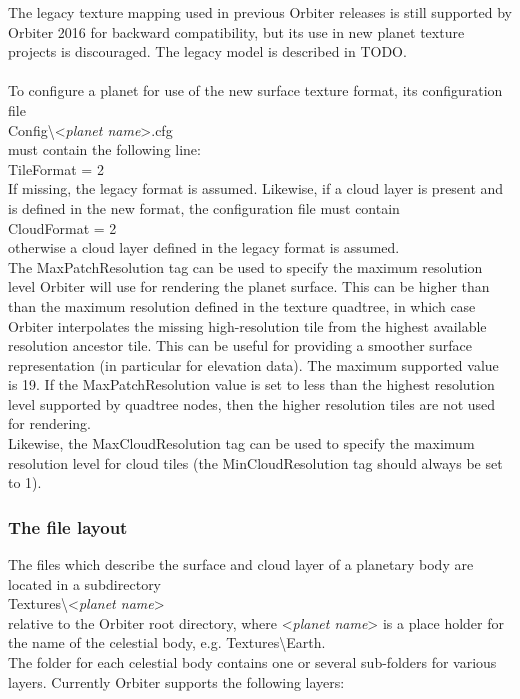\documentclass[Orbiter Developer Manual.tex]{subfiles}
\begin{document}
\noindent
The legacy texture mapping used in previous Orbiter releases is still supported by Orbiter 2016 for backward compatibility, but its use in new planet texture projects is discouraged. The legacy model is described in TODO.\\
\\
To configure a planet for use of the new surface texture format, its configuration file\\
\indent Config\textbackslash <\textit{planet name}>.cfg\\
must contain the following line:\\
\indent TileFormat = 2\\
If missing, the legacy format is assumed. Likewise, if a cloud layer is present and is defined in the new format, the configuration file must contain\\
\indent CloudFormat = 2\\
otherwise a cloud layer defined in the legacy format is assumed.\\
The MaxPatchResolution tag can be used to specify the maximum resolution level Orbiter will use for rendering the planet surface. This can be higher than than the maximum resolution defined in the texture quadtree, in which case Orbiter interpolates the missing high-resolution tile from the highest available resolution ancestor tile. This can be useful for providing a smoother surface representation (in particular for elevation data). The maximum supported value is 19. If the MaxPatchResolution value is set to less than the highest resolution level supported by quadtree nodes, then the higher resolution tiles are not used for rendering.\\
Likewise, the MaxCloudResolution tag can be used to specify the maximum resolution level for cloud tiles (the MinCloudResolution tag should always be set to 1).


\subsubsection{The file layout}
The files which describe the surface and cloud layer of a planetary body are located in a subdirectory\\
\indent Textures\textbackslash <\textit{planet name}>\\
relative to the Orbiter root directory, where <\textit{planet name}> is a place holder for the name of the celestial body, e.g. Textures\textbackslash Earth.\\
The folder for each celestial body contains one or several sub-folders for various layers. Currently Orbiter supports the following layers:
\end{document}
